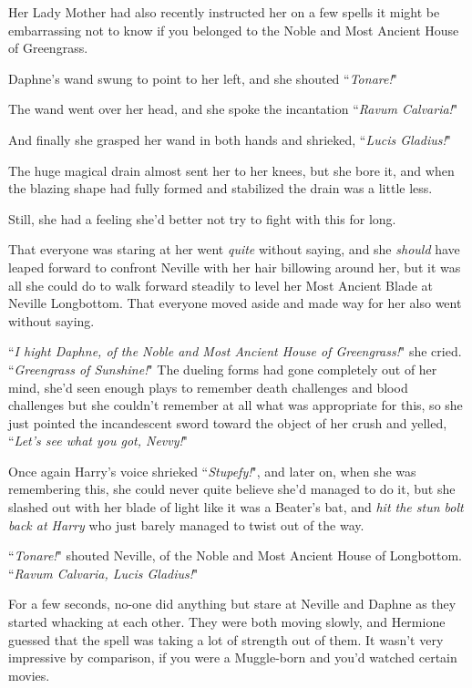 Her Lady Mother had also recently instructed her on a few spells it might be embarrassing not to know if you belonged to the Noble and Most Ancient House of Greengrass.

Daphne's wand swung to point to her left, and she shouted ``\emph{Tonare!}"

The wand went over her head, and she spoke the incantation ``\emph{Ravum Calvaria!}"

And finally she grasped her wand in both hands and shrieked, ``\emph{Lucis Gladius!}"

The huge magical drain almost sent her to her knees, but she bore it, and when the blazing shape had fully formed and stabilized the drain was a little less.

Still, she had a feeling she'd better not try to fight with this for long.

That everyone was staring at her went \emph{quite} without saying, and she \emph{should} have leaped forward to confront Neville with her hair billowing around her, but it was all she could do to walk forward steadily to level her Most Ancient Blade at Neville Longbottom. That everyone moved aside and made way for her also went without saying.

``\emph{I hight Daphne, of the Noble and Most Ancient House of Greengrass!}" she cried. ``\emph{Greengrass of Sunshine!}" The dueling forms had gone completely out of her mind, she'd seen enough plays to remember death challenges and blood challenges but she couldn't remember at all what was appropriate for this, so she just pointed the incandescent sword toward the object of her crush and yelled, ``\emph{Let's see what you got, Nevvy!}"

Once again Harry's voice shrieked ``\emph{Stupefy!}", and later on, when she was remembering this, she could never quite believe she'd managed to do it, but she slashed out with her blade of light like it was a Beater's bat, and \emph{hit the stun bolt back at Harry} who just barely managed to twist out of the way.

``\emph{Tonare!}" shouted Neville, of the Noble and Most Ancient House of Longbottom. ``\emph{Ravum Calvaria, Lucis Gladius!}"

\later

For a few seconds, no-one did anything but stare at Neville and Daphne as they started whacking at each other. They were both moving slowly, and Hermione guessed that the spell was taking a lot of strength out of them. It wasn't very impressive by comparison, if you were a Muggle-born and you'd watched certain movies.

